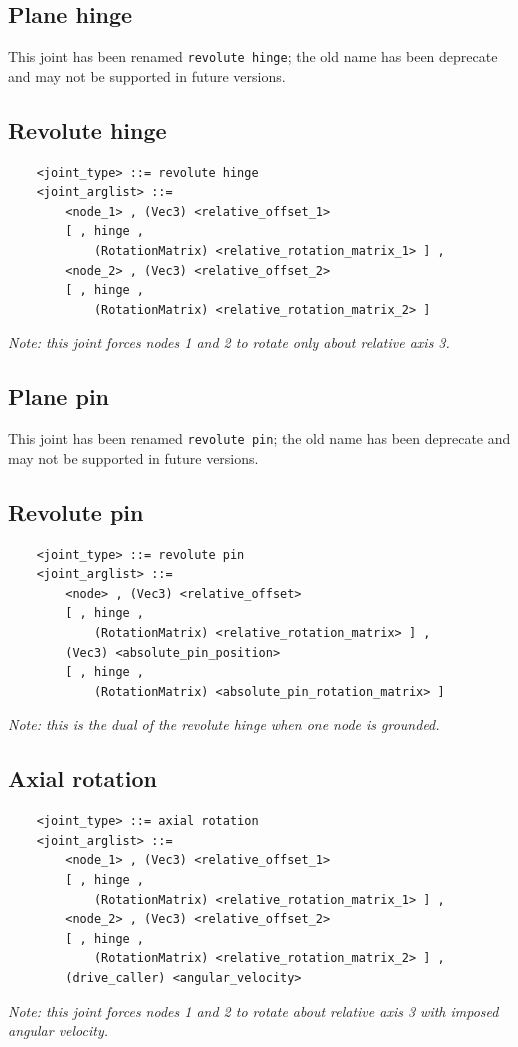 \subsection{Plane hinge}
This joint has been renamed \texttt{revolute hinge}; the old name has been
deprecate and may not be supported in future versions.

\subsection{Revolute hinge}
\begin{verbatim}
    <joint_type> ::= revolute hinge
    <joint_arglist> ::= 
        <node_1> , (Vec3) <relative_offset_1> 
        [ , hinge , 
            (RotationMatrix) <relative_rotation_matrix_1> ] ,
        <node_2> , (Vec3) <relative_offset_2>
        [ , hinge , 
            (RotationMatrix) <relative_rotation_matrix_2> ]
\end{verbatim}
{\em
    Note: this joint forces nodes 1 and 2 to rotate only about relative 
    axis 3.
}

\subsection{Plane pin}
This joint has been renamed \texttt{revolute pin}; the old name has been
deprecate and may not be supported in future versions.

\subsection{Revolute pin}
\begin{verbatim}
    <joint_type> ::= revolute pin
    <joint_arglist> ::= 
        <node> , (Vec3) <relative_offset>
        [ , hinge , 
            (RotationMatrix) <relative_rotation_matrix> ] ,
        (Vec3) <absolute_pin_position>
        [ , hinge , 
            (RotationMatrix) <absolute_pin_rotation_matrix> ]
\end{verbatim}
{\em
    Note: this is the dual of the revolute hinge when one node is grounded.
}

\subsection{Axial rotation}
\begin{verbatim}
    <joint_type> ::= axial rotation
    <joint_arglist> ::= 
        <node_1> , (Vec3) <relative_offset_1> 
        [ , hinge , 
            (RotationMatrix) <relative_rotation_matrix_1> ] ,
        <node_2> , (Vec3) <relative_offset_2>
        [ , hinge , 
            (RotationMatrix) <relative_rotation_matrix_2> ] ,
        (drive_caller) <angular_velocity>
\end{verbatim}
{\em
    Note: this joint forces nodes 1 and 2 to rotate about relative 
    axis 3 with imposed angular velocity.
}

